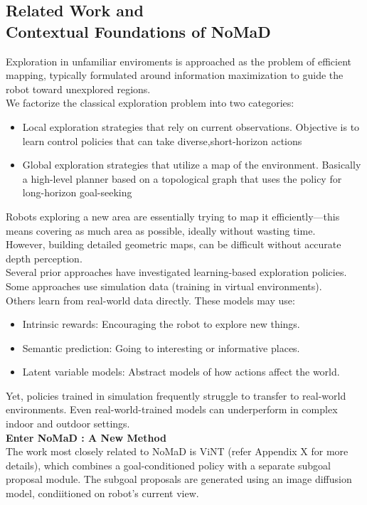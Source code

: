 \documentclass[12pt]{article}
\begin{document}
\begin{appendices}
\section{Related Work and \\ Contextual Foundations of NoMaD}
\label{app:related_work}
Exploration in unfamiliar enviroments is approached as the problem of efficient mapping, typically formulated around information maximization to guide the robot toward unexplored regions.\\
We factorize the classical exploration problem into two categories:\\
\begin{itemize}
    \item Local exploration strategies that rely on current observations. Objective is to learn control policies that can take diverse,short-horizon actions
    \item Global exploration strategies that utilize a map of the environment. Basically a high-level planner based on a topological graph that uses the policy for long-horizon goal-seeking
\end{itemize}
Robots exploring a new area are essentially trying to map it efficiently—this means covering as much area as possible, ideally without wasting time.\\
However, building detailed geometric maps, can be difficult without accurate depth perception. \\
Several prior approaches have investigated learning-based exploration policies. Some approaches use simulation data (training in virtual environments).\\
Others learn from real-world data directly. These models may use:\\
\begin{itemize}
    \item Intrinsic rewards: Encouraging the robot to explore new things.
    \item Semantic prediction: Going to interesting or informative places.
    \item Latent variable models: Abstract models of how actions affect the world.
\end{itemize}
Yet, policies trained in simulation frequently struggle to transfer to real-world environments. Even real-world-trained models can underperform in complex indoor and outdoor settings.\\
\bigskip
\noindent \textbf{Enter NoMaD : A New Method}\\ 
The work most closely related to NoMaD is ViNT (refer Appendix X for more details), which combines a goal-conditioned policy with a separate subgoal proposal module. The subgoal proposals are generated using an image diffusion model, condiitioned on robot's current view.\\

\end{appendices}
\end{document}
